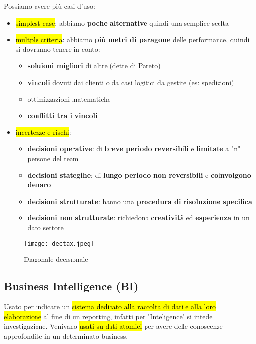 Possiamo avere più casi d'uso:
\begin{itemize}
	\item \hl{simplest case}: abbiamo \textbf{poche alternative} quindi una semplice scelta
	\item \hl{multple criteria}: abbiamo \textbf{più metri di paragone} delle performance, quindi si dovranno tenere in conto:
	
	\begin{itemize}
		\item \textbf{soluioni migliori} di altre (dette di Pareto)
		\item \textbf{vincoli} dovuti dai clienti o da casi logitici da gestire (es: spedizioni)
		\item ottimizzazioni matematiche
		\item \textbf{conflitti tra i vincoli}
	\end{itemize}
	
	\item \hl{incertezze e rischi}: 
	
	\begin{itemize}
		\item \textbf{decisioni operative}: di \textbf{breve periodo}  \textbf{reversibili} e \textbf{limitate} a "n" persone del team
		\item \textbf{decisioni stategihe}: di \textbf{lungo periodo}  \textbf{non reversibili} e \textbf{coinvolgono denaro}
		\item \textbf{decisioni strutturate}: hanno una \textbf{procedura di risoluzione specifica}
		\item \textbf{decisioni non strutturate}: richiedono \textbf{creatività} ed \textbf{esperienza} in un  dato settore
	\end{itemize}
\end{itemize}

\begin{figure}[H]
\centering
\texttt{[image: dectax.jpeg]}
\caption{Diagonale decisionale} 
\label{diadec}
\end{figure}


\subsection{Business Intelligence (BI)}

Usato per indicare un \hl{sistema dedicato alla raccolta di dati e alla loro elaborazione} al fine di un reporting, infatti per "Inteligence" si intede investigazione.
Venivano \hl{usati su dati atomici} per avere delle conoscenze approfondite in un determinato business.


